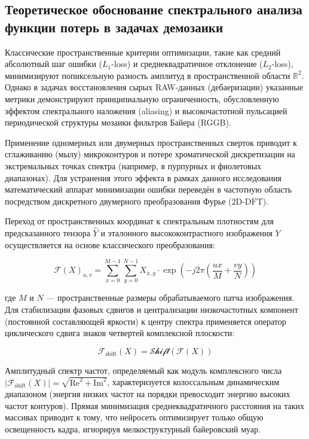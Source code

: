 \documentclass[12pt,a4paper]{article}
\begin{document}
\subsection{Теоретическое обоснование спектрального анализа функции потерь в задачах демозаики}

Классические пространственные критерии оптимизации, такие как средний абсолютный шаг ошибки ($L_1$-loss) и среднеквадратичное отклонение ($L_2$-loss), минимизируют попиксельную разность амплитуд в пространственной области $\mathbb{R}^{2}$. Однако в задачах восстановления сырых RAW-данных (дебаеризации) указанные метрики демонстрируют принципиальную ограниченность, обусловленную эффектом спектрального наложения (aliasing) и высокочастотной пульсацией периодической структуры мозаики фильтров Байера (RGGB).

Применение одномерных или двумерных пространственных сверток приводит к сглаживанию (мылу) микроконтуров и потере хроматической дискретизации на экстремальных точках спектра (например, в пурпурных и фиолетовых диапазонах). Для устранения этого эффекта в рамках данного исследования математический аппарат минимизации ошибки переведён в частотную область посредством дискретного двумерного преобразования Фурье ($\text{2D-DFT}$).

Переход от пространственных координат к спектральным плотностям для предсказанного тензора $\hat{Y}$ и эталонного высококонтрастного изображения $Y$ осуществляется на основе классического преобразования:

\begin{equation}
\mathcal{F}(X)_{u,v} = \sum_{x=0}^{M-1} \sum_{y=0}^{N-1} X_{x,y} \cdot \exp\left( -j 2\pi \left( \frac{ux}{M} + \frac{vy}{N} \right) \right)
\end{equation}

где $M$ и $N$ — пространственные размеры обрабатываемого патча изображения. Для стабилизации фазовых сдвигов и централизации низкочастотных компонент (постоянной составляющей яркости) к центру спектра применяется оператор циклического сдвига знаков четвертей комплексной плоскости:

\begin{equation}
\mathcal{F}_{\text{shift}}(X) = \mathcal{Shift}\left( \mathcal{F}(X) \right)
\end{equation}

Амплитудный спектр частот, определяемый как модуль комплексного числа $| \mathcal{F}_{\text{shift}}(X) | = \sqrt{\text{Re}^2 + \text{Im}^2}$, характеризуется колоссальным динамическим диапазоном (энергия низких частот на порядки превосходит энергию высоких частот контуров). Прямая минимизация среднеквадратичного расстояния на таких массивах приводит к тому, что нейросеть оптимизирует только общую освещенность кадра, игнорируя мелкоструктурный байеровский муар.
\end{document}
